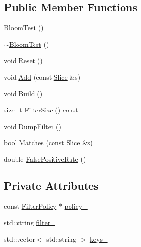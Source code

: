 \subsection*{Public Member Functions}
\begin{DoxyCompactItemize}
\item 
\hyperlink{classleveldb_1_1_bloom_test_a339a382294295be3e78dfccd25b945fc}{Bloom\+Test} ()
\item 
\hyperlink{classleveldb_1_1_bloom_test_a3370b88a1df119a64ced88ac71bfb6e2}{$\sim$\+Bloom\+Test} ()
\item 
void \hyperlink{classleveldb_1_1_bloom_test_a067ba6753890a5a924edd7efaad7187a}{Reset} ()
\item 
void \hyperlink{classleveldb_1_1_bloom_test_a2f7777014cec7c35f85373e2832bfd88}{Add} (const \hyperlink{classleveldb_1_1_slice}{Slice} \&s)
\item 
void \hyperlink{classleveldb_1_1_bloom_test_ad4fc802152c68599c919d33917523d31}{Build} ()
\item 
size\+\_\+t \hyperlink{classleveldb_1_1_bloom_test_accd2f436396b2324d89043c2a97f0c3a}{Filter\+Size} () const 
\item 
void \hyperlink{classleveldb_1_1_bloom_test_a6f210bc2f2e69c0aeb570fa4dbe4d0da}{Dump\+Filter} ()
\item 
bool \hyperlink{classleveldb_1_1_bloom_test_a1d2a9794bd26ac0124a18511689ef211}{Matches} (const \hyperlink{classleveldb_1_1_slice}{Slice} \&s)
\item 
double \hyperlink{classleveldb_1_1_bloom_test_abf887498db753825b308933df22c0bbb}{False\+Positive\+Rate} ()
\end{DoxyCompactItemize}
\subsection*{Private Attributes}
\begin{DoxyCompactItemize}
\item 
const \hyperlink{classleveldb_1_1_filter_policy}{Filter\+Policy} $\ast$ \hyperlink{classleveldb_1_1_bloom_test_aad08549895e8878b853205916a074cde}{policy\+\_\+}
\item 
std\+::string \hyperlink{classleveldb_1_1_bloom_test_a13fbea63f8f60fd3987745a5110084f1}{filter\+\_\+}
\item 
std\+::vector$<$ std\+::string $>$ \hyperlink{classleveldb_1_1_bloom_test_ad368ca79808b8350f679bb5f049d8095}{keys\+\_\+}
\end{DoxyCompactItemize}


